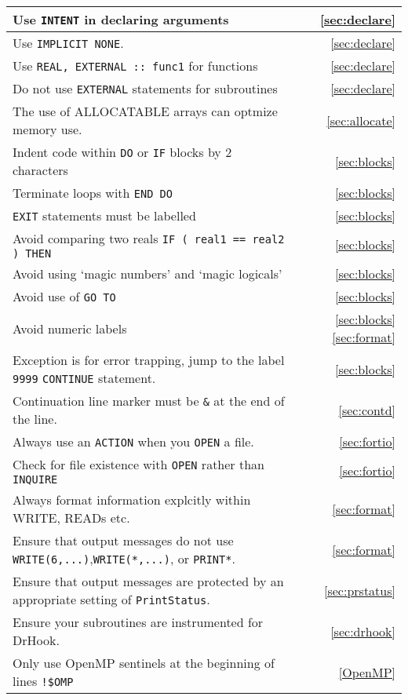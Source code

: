 \begin{tabular}{|l|r|}
Use \verb|INTENT| in declaring arguments & \ref{sec:declare} \\ \hline
Use \verb|IMPLICIT NONE|. & \ref{sec:declare} \\ \hline
Use \verb|REAL, EXTERNAL :: func1| for functions & \ref{sec:declare}\\ \hline
Do not use \verb|EXTERNAL| statements for subroutines & \ref{sec:declare}\\ \hline
The use of ALLOCATABLE arrays can optmize memory use. & \ref{sec:allocate}\\ \hline
Indent code within \verb|DO| or \verb|IF| blocks by 2 characters & \ref{sec:blocks}\\ \hline
Terminate loops with \verb|END DO|  & \ref{sec:blocks} \\ \hline
\verb|EXIT| statements must be labelled & \ref{sec:blocks} \\ \hline
Avoid comparing two reals \verb|IF ( real1 == real2 ) THEN| & \ref{sec:blocks} \\ \hline
Avoid using `magic numbers' and `magic logicals'& \ref{sec:blocks} \\ \hline
Avoid use of \verb|GO TO| & \ref{sec:blocks} \\ \hline
Avoid numeric labels & \ref{sec:blocks} \ref{sec:format} \\ \hline
Exception is for error trapping, jump to the label \verb|9999| \verb|CONTINUE| statement. & \ref{sec:blocks} \\ \hline
Continuation line marker must be \verb|&| at the end of the line. & \ref{sec:contd} \\ \hline
Always use an \verb|ACTION| when you \verb|OPEN| a file. & \ref{sec:fortio} \\ \hline
Check for file existence with \verb|OPEN| rather than \verb|INQUIRE| & \ref{sec:fortio} \\ \hline
Always format information explcitly within WRITE, READs etc.& \ref{sec:format} \\ \hline
Ensure that output messages do not use \verb|WRITE(6,...)|,\verb|WRITE(*,...)|, or \verb|PRINT*|. & \ref{sec:format}\\ \hline
Ensure that output messages are protected by an appropriate setting of \verb|PrintStatus|. & \ref{sec:prstatus}\\ \hline
Ensure your subroutines are instrumented for DrHook. & \ref{sec:drhook} \\ \hline
Only use OpenMP sentinels at the beginning of lines \verb|!$OMP| & \ref{OpenMP} \\ \hline

\end{tabular}
